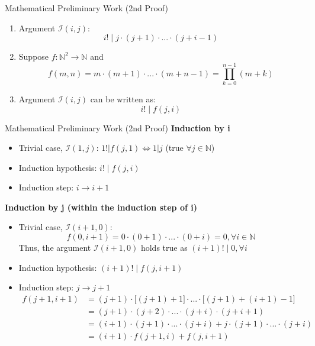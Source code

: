 \documentclass[xcolor=dvipsnames]{beamer}
\begin{document}
\begin{frame}{Mathematical Preliminary Work (2nd Proof)}
    \begin{enumerate}
        \item Argument $\mathcal{I}(i, j)$: 
        \[
            i! \mid j \cdot (j + 1) \cdot ... \cdot (j + i -1)
        \]
        \item Suppose $f:\mathbb{N}^2 \rightarrow \mathbb{N}$ and
        \[
            f(m, n) = m \cdot (m + 1) \cdot ... \cdot (m + n - 1) = 
            \prod_{k=0}^{n-1}(m + k)
        \]
        \item Argument $\mathcal{I}(i, j)$ can be written as:
        \[
            i! \mid f(j, i)
        \]
    \end{enumerate}
\end{frame}

\begin{frame}{Mathematical Preliminary Work (2nd Proof)}
    \textbf{Induction by i}
    \begin{itemize}
        \item Trivial case, $\mathcal{I}(1, j)$: 
        $1! | f(j, 1) \Leftrightarrow 1 | j$ (true $\forall j \in \mathbb{N}$)
        \item Induction hypothesis: $i! \mid f(j, i)$
        \item Induction step: $i \rightarrow i + 1$
    \end{itemize}

    \pause

    \hfill

    \textbf{Induction by j (within the induction step of i)}
    \begin{itemize}
        \item Trivial case, $\mathcal{I}(i+1, 0)$: \\
        \[
            f(0, i+1) = 0 \cdot (0 + 1) \cdot ... \cdot (0 + i) = 0, \forall i \in \mathbb{N}
        \]
        Thus, the argument $\mathcal{I}(i+1, 0)$ holds true as $(i+1)! \mid 0, \forall i$
        \item Induction hypothesis: $(i+1)! \mid f(j, i+1)$
        \item Induction step: $j \rightarrow j + 1$
        { \small
        \begin{align*}
            f(j+1, i+1) &= (j+1) \cdot \bigl[(j+1) + 1\bigr] \cdot ... \cdot 
            \bigl[(j+1) + (i+1) - 1\bigr] \\
            &= (j+1) \cdot (j+2) \cdot ... \cdot (j+i) \cdot (j+i+1) \\
            &= (i+1)\cdot(j+1)\cdot ... \cdot (j+i) + j \cdot (j+1) \cdot ... \cdot (j+i) \\
            &= (i+1)\cdot f(j+1, i) + f(j, i+1)
        \end{align*}
        }
    \end{itemize}
\end{frame}
\end{document}
